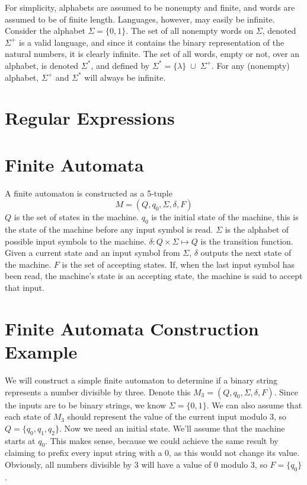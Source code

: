 \documentclass{bcthesis}
\begin{document}
		For simplicity, alphabets are assumed to be nonempty and finite, and words are assumed to be of finite length.
		Languages, however, may easily be infinite.
		Consider the alphabet $\Sigma = \{ 0, 1 \}$.
		The set of all nonempty words on $\Sigma$, denoted $\Sigma^+$ is a valid language, and since it contains the binary representation of the natural numbers, it is clearly infinite.
		The set of all words, empty or not, over an alphabet, is denoted $\Sigma^*$, and defined by $\Sigma^* = \{ \lambda \} \; \cup \; \Sigma^+$.
		For any (nonempty) alphabet, $\Sigma^+$ and $\Sigma^*$ will always be infinite.



	\section{Regular Expressions} %
	\label{sec:regular_expressions}
		

	\section{Finite Automata} %
	\label{sec:finite_automata}
		A finite automaton is constructed as a 5-tuple
		\[
			M = (Q, q_0, \Sigma, \delta, F)
		\]
		$Q$ is the set of states in the machine.
		$q_0$ is the initial state of the machine, this is the state of the machine before any input symbol is read.
		$\Sigma$ is the alphabet of possible input symbols to the machine.
		$\delta: Q \times \Sigma \mapsto Q$ is the transition function.
		Given a current state and an input symbol from $\Sigma$, $\delta$ outputs the next state of the machine.
		$F$ is the set of accepting states.
		If, when the last input symbol has been read, the machine's state is an accepting state, the machine is said to accept that input.

	\section{Finite Automata Construction Example} %
	\label{sec:finite_automata_construction_example}
		We will construct a simple finite automaton to determine if a binary string represents a number divisible by three.
		Denote this $M_3 = (Q, q_0, \Sigma, \delta, F)$.
		Since the inputs are to be binary strings, we know $\Sigma = \{ 0, 1 \}$.
		We can also assume that each state of $M_3$ should represent the value of the current input modulo 3, so $Q = \{q_0, q_1, q_2\}$.
		Now we need an initial state. 
		We'll assume that the machine starts at $q_0$. 
		This makes sense, because we could achieve the same result by claiming to prefix every input string with a 0, as this would not change its value.
		Obviously, all numbers divisible by 3 will have a value of 0 modulo 3, so $F = \{q_0\}$.
\end{document}
